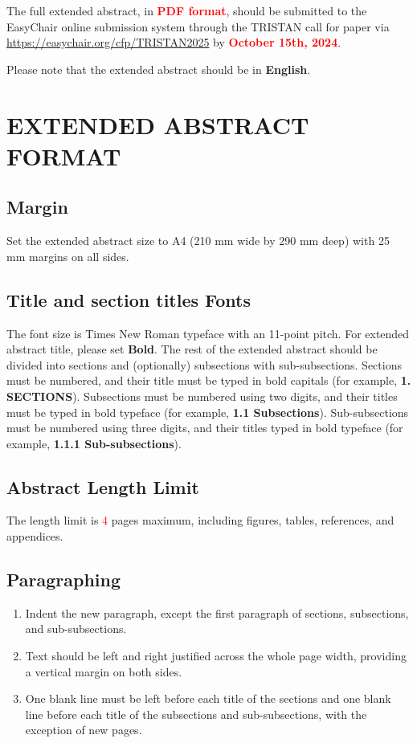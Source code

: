 \documentclass[a4paper,twoside,11pt]{article}
\begin{document}
The full extended abstract, in \textcolor{red}{\textbf{PDF format}}, should be submitted to the EasyChair online submission system through the TRISTAN call for paper via \url{https://easychair.org/cfp/TRISTAN2025} by \textbf{\textcolor{red}{October 15th, 2024}}. 

Please note that the extended abstract should be in \textbf{English}. 
\section{ EXTENDED ABSTRACT FORMAT}

\subsection{Margin}
Set the extended abstract size to A4 (210 mm wide by 290 mm deep) with 25 mm margins on all sides.

\subsection{Title and section titles Fonts}

The font size is Times New Roman typeface with an 11-point pitch. For extended abstract title, please set \textbf{Bold}. The rest of the extended abstract should be divided into sections and (optionally) subsections with sub-subsections.  Sections must be numbered, and their title must be typed in bold capitals (for example, \textbf{1. SECTIONS}).  Subsections must be numbered using two digits, and their titles must be typed in bold typeface (for example, \textbf{1.1 Subsections}).  Sub-subsections must be numbered using three digits, and their titles typed in bold typeface (for example, \textbf{1.1.1 Sub-subsections}).

\subsection{Abstract Length Limit}

The length limit is \textcolor{red}{4} pages maximum, including figures, tables, references, and appendices.

\subsection{Paragraphing}

\begin{enumerate}
\item  Indent the new paragraph, except the first paragraph of sections, subsections, and sub-subsections.

\item  Text should be left and right justified across the whole page width, providing a vertical margin on both sides.

\item  One blank line must be left before each title of the sections and one blank line before each title of the subsections and sub-subsections, with the exception of new pages.

\end{enumerate}
\end{document}
